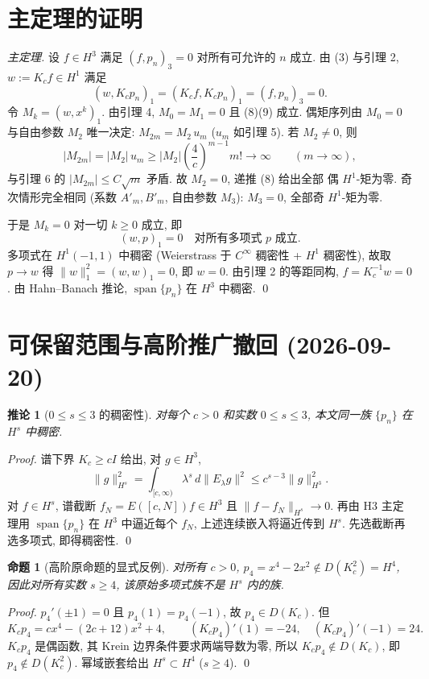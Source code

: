 \documentclass[UTF8]{ctexart}
\newtheorem{proposition}[theorem]{命题}
\newtheorem{corollary}[theorem]{推论}
\begin{document}
\section{主定理的证明}

\begin{proof}[主定理]
设 $f \in H^3$ 满足 $(f, p_n)_3 = 0$ 对所有可允许的 $n$ 成立. 由 (3) 与引理 2,
$w := K_c f \in H^1$ 满足
\[
	(w, K_c p_n)_1 = (K_c f, K_c p_n)_1 = (f, p_n)_3 = 0.
\]
令 $M_k = (w, x^k)_1$. 由引理 4, $M_0 = M_1 = 0$ 且 (8)(9) 成立.
偶矩序列由 $M_0 = 0$ 与自由参数 $M_2$ 唯一决定: $M_{2m} = M_2\, u_m$
($u_m$ 如引理 5). 若 $M_2 \neq 0$, 则
\[
	|M_{2m}| = |M_2|\, u_m \geq |M_2| \left( \frac{4}{c} \right)^{m-1} m! \to \infty
	\qquad (m \to \infty),
\]
与引理 6 的 $|M_{2m}| \leq C\sqrt{m}$ 矛盾. 故 $M_2 = 0$, 递推 (8) 给出全部
偶 $H^1$-矩为零. 奇次情形完全相同 (系数 $A'_m, B'_m$, 自由参数 $M_3$):
$M_3 = 0$, 全部奇 $H^1$-矩为零.

于是 $M_k = 0$ 对一切 $k \geq 0$ 成立, 即
\[
	(w, p)_1 = 0 \quad \text{对所有多项式 } p \text{ 成立}.
\]
多项式在 $H^1(-1,1)$ 中稠密 (Weierstrass 于 $C^\infty$ 稠密性 + $H^1$ 稠密性),
故取 $p \to w$ 得 $\|w\|_1^2 = (w, w)_1 = 0$, 即 $w = 0$. 由引理 2 的等距同构,
$f = K_c^{-1} w = 0$. 由 Hahn--Banach 推论, $\operatorname{span}\{p_n\}$
在 $H^3$ 中稠密. \qed
\end{proof}

\section{可保留范围与高阶推广撤回 (2026-09-20)}\label{sec:corrected-scope}

\begin{corollary}[$0\le s\le3$ 的稠密性]\label{cor:low-order}
对每个 $c>0$ 和实数 $0\le s\le3$, 本文同一族 $\{p_n\}$ 在 $H^s$ 中稠密.
\end{corollary}
\begin{proof}
谱下界 $K_c\ge cI$ 给出, 对 $g\in H^3$,
\[
 \|g\|_{H^s}^2=\int_{[c,\infty)}\lambda^s\,d\|E_\lambda g\|^2
 \le c^{s-3}\|g\|_{H^3}^2.
\]
对 $f\in H^s$, 谱截断 $f_N=E([c,N])f\in H^3$ 且
$\|f-f_N\|_{H^s}\to0$. 再由 H3 主定理用 $\operatorname{span}\{p_n\}$
在 $H^3$ 中逼近每个 $f_N$, 上述连续嵌入将逼近传到 $H^s$.
先选截断再选多项式, 即得稠密性. \qed
\end{proof}

\begin{proposition}[高阶原命题的显式反例]\label{prop:domain-obstruction}
对所有 $c>0$, $p_4=x^4-2x^2\notin D(K_c^2)=H^4$,
因此对所有实数 $s\ge4$, 该原始多项式族不是 $H^s$ 内的族.
\end{proposition}
\begin{proof}
$p_4'(\pm1)=0$ 且 $p_4(1)=p_4(-1)$, 故 $p_4\in D(K_c)$.
但
\[
 K_cp_4=cx^4-(2c+12)x^2+4,\qquad
 (K_cp_4)'(1)=-24,\quad (K_cp_4)'(-1)=24.
\]
$K_cp_4$ 是偶函数, 其 Krein 边界条件要求两端导数为零, 所以
$K_cp_4\notin D(K_c)$, 即 $p_4\notin D(K_c^2)$.
幂域嵌套给出 $H^s\subset H^4$ ($s\ge4$). \qed
\end{proof}
\end{document}
